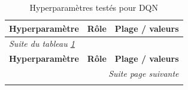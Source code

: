 \begingroup
\footnotesize
\setlength{\tabcolsep}{8pt}
\renewcommand{\arraystretch}{1.4}
\begin{longtable}{%
  p{\hpColA}%
  p{\dimexpr\textwidth - \hpColA - \hpColC - 6\tabcolsep\relax}%
  p{\hpColC}%
}
  \caption{Hyperparamètres testés pour DQN}
  \label{tab:hparams_dqn}\\
  \toprule
  \textbf{Hyperparamètre} & \textbf{Rôle} & \textbf{Plage / valeurs}\\
  \midrule
\endfirsthead
  \multicolumn{3}{l}{\footnotesize\itshape Suite du tableau \ref{tab:hparams_dqn}}\\[2pt]
  \toprule
  \textbf{Hyperparamètre} & \textbf{Rôle} & \textbf{Plage / valeurs}\\
  \midrule
\endhead
  \midrule
  \multicolumn{3}{r}{\footnotesize\itshape Suite page suivante}\\
\endfoot
  \bottomrule
\endlastfoot


\end{longtable}
